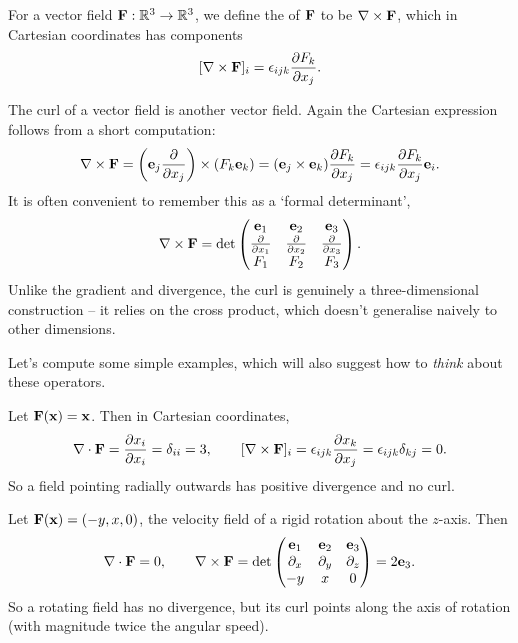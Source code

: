 \documentclass[a4paper]{scrartcl}
\begin{document}
\begin{definition}[Curl]
	For a vector field $\mathbf{F} : \mathbb{R}^3 \rightarrow \mathbb{R}^3$, we define the  of $\mathbf{F}$ to be $\nabla \times \mathbf{F}$, which in Cartesian coordinates has components
	$$
	[\nabla \times \mathbf{F}]_i = \epsilon_{ijk} \frac{\partial F_k}{\partial x_j}.
	$$
\end{definition}

The curl of a vector field is another vector field. Again the Cartesian expression follows from a short computation:
$$
\nabla \times \mathbf{F} = \left(\mathbf{e}_j \frac{\partial}{\partial x_j}\right) \times (F_k \mathbf{e}_k) = (\mathbf{e}_j \times \mathbf{e}_k) \frac{\partial F_k}{\partial x_j} = \epsilon_{ijk} \frac{\partial F_k}{\partial x_j} \mathbf{e}_i.
$$
It is often convenient to remember this as a `formal determinant',
$$
\nabla \times \mathbf{F} = \det \begin{pmatrix}
	\mathbf{e}_1 & \mathbf{e}_2 & \mathbf{e}_3 \\
	\frac{\partial}{\partial x_1} & \frac{\partial}{\partial x_2} & \frac{\partial}{\partial x_3} \\
	F_1 & F_2 & F_3
\end{pmatrix}.
$$
Unlike the gradient and divergence, the curl is genuinely a three-dimensional construction -- it relies on the cross product, which doesn't generalise naively to other dimensions.

Let's compute some simple examples, which will also suggest how to \emph{think} about these operators.

\begin{example}
	Let $\mathbf{F}(\mathbf{x}) = \mathbf{x}$. Then in Cartesian coordinates,
	$$
	\nabla \cdot \mathbf{F} = \frac{\partial x_i}{\partial x_i} = \delta_{ii} = 3,
	\quad \quad
	[\nabla \times \mathbf{F}]_i = \epsilon_{ijk} \frac{\partial x_k}{\partial x_j} = \epsilon_{ijk} \delta_{kj} = 0.
	$$
	So a field pointing radially outwards has positive divergence and no curl.
\end{example}

\begin{example}
	Let $\mathbf{F}(\mathbf{x}) = (-y, x, 0)$, the velocity field of a rigid rotation about the $z$-axis. Then
	$$
	\nabla \cdot \mathbf{F} = 0, \quad \quad \nabla \times \mathbf{F} = \det\begin{pmatrix}
		\mathbf{e}_1 & \mathbf{e}_2 & \mathbf{e}_3 \\
		\partial_x & \partial_y & \partial_z \\
		-y & x & 0
	\end{pmatrix} = 2 \mathbf{e}_3.
	$$
	So a rotating field has no divergence, but its curl points along the axis of rotation (with magnitude twice the angular speed).
\end{example}
\end{document}

